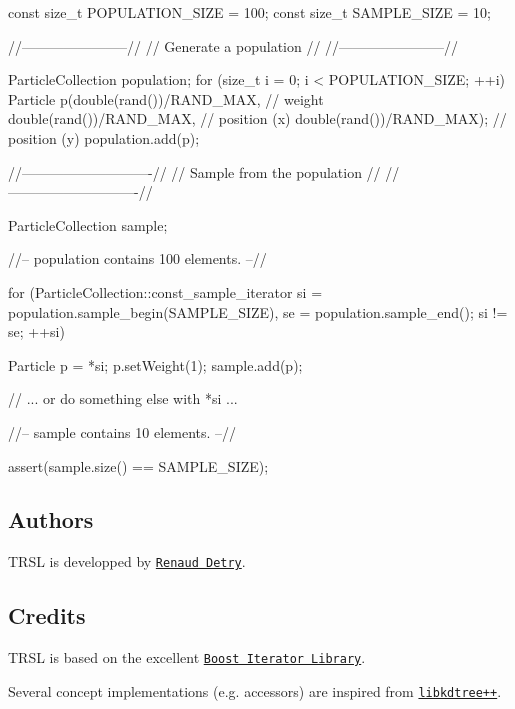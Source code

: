 \begin{DoxyCodeInclude}
const size_t POPULATION_SIZE = 100;
const size_t SAMPLE_SIZE = 10;

//-----------------------//
// Generate a population //
//-----------------------//

ParticleCollection population;
for (size_t i = 0; i < POPULATION_SIZE; ++i)
{
  Particle p(double(rand())/RAND_MAX,  // weight
             double(rand())/RAND_MAX,  // position (x)
             double(rand())/RAND_MAX); // position (y)
  population.add(p);
}

//----------------------------//
// Sample from the population //
//----------------------------//

ParticleCollection sample;

//-- population contains 100 elements. --//

for (ParticleCollection::const_sample_iterator
       si = population.sample_begin(SAMPLE_SIZE),
       se = population.sample_end();
     si != se; ++si)
{
  Particle p = *si;
  p.setWeight(1);
  sample.add(p);

  // ... or do something else with *si ...
}

//-- sample contains 10 elements. --//

assert(sample.size() == SAMPLE_SIZE);
\end{DoxyCodeInclude}
\hypertarget{index_index_author}{}\subsection{Authors}\label{index_index_author}
TRSL is developped by \href{http://sourceforge.net/users/renauddetry/}{\tt Renaud Detry}.\hypertarget{index_index_credits}{}\subsection{Credits}\label{index_index_credits}
TRSL is based on the excellent \href{http://www.boost.org/libs/iterator/doc/index.html}{\tt Boost Iterator Library}.

Several concept implementations (e.g. accessors) are inspired from \href{http://libkdtree.alioth.debian.org}{\tt libkdtree++}. 